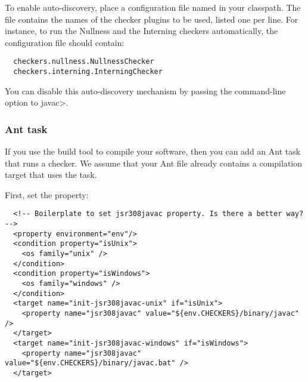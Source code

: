 To enable auto-discovery, place a configuration file named
in your classpath.  The file contains the names of the checker plugins to
be used, listed one per line.  For instance, to run the Nullness and the
Interning checkers automatically, the configuration file should contain:

\begin{smaller}
\begin{Verbatim}
  checkers.nullness.NullnessChecker
  checkers.interning.InterningChecker
\end{Verbatim}
\end{smaller}

You can disable this auto-discovery mechanism by passing the
 command-line option to \<javac>.




\subsubsection{Ant task\label{ant-task}}

If you use the  build tool to compile
your software, then you can add an Ant task that runs a checker.  We assume
that your Ant file already contains a compilation target that uses the
 task.

First, set the  property:

\begin{smaller}
\begin{Verbatim}
  <!-- Boilerplate to set jsr308javac property. Is there a better way? -->
  <property environment="env"/>
  <condition property="isUnix">
    <os family="unix" />
  </condition>
  <condition property="isWindows">
    <os family="windows" />
  </condition>
  <target name="init-jsr308javac-unix" if="isUnix">
    <property name="jsr308javac" value="${env.CHECKERS}/binary/javac" />
  </target>
  <target name="init-jsr308javac-windows" if="isWindows">
    <property name="jsr308javac" value="${env.CHECKERS}/binary/javac.bat" />
  </target>
\end{Verbatim}
\end{smaller}

